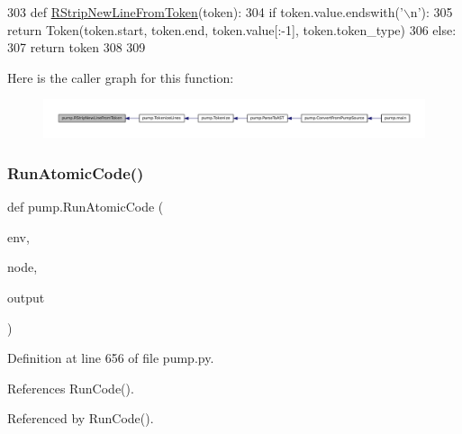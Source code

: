 \begin{DoxyCode}
303 \textcolor{keyword}{def }\hyperlink{namespacepump_ae07150d94399cbe1661abe5929f921e0}{RStripNewLineFromToken}(token):
304   \textcolor{keywordflow}{if} token.value.endswith(\textcolor{stringliteral}{'\(\backslash\)n'}):
305     \textcolor{keywordflow}{return} Token(token.start, token.end, token.value[:-1], token.token\_type)
306   \textcolor{keywordflow}{else}:
307     \textcolor{keywordflow}{return} token
308 
309 
\end{DoxyCode}
Here is the caller graph for this function\+:
\nopagebreak
\begin{figure}[H]
\begin{center}
\leavevmode
\includegraphics[width=350pt]{namespacepump_ae07150d94399cbe1661abe5929f921e0_icgraph}
\end{center}
\end{figure}
\mbox{\label{namespacepump_a901e6abd34691a0d779178a615cc09c1}} 
\subsubsection{\texorpdfstring{Run\+Atomic\+Code()}{RunAtomicCode()}}
{\footnotesize\ttfamily def pump.\+Run\+Atomic\+Code (\begin{DoxyParamCaption}\item[{}]{env,  }\item[{}]{node,  }\item[{}]{output }\end{DoxyParamCaption})}



Definition at line 656 of file pump.\+py.



References Run\+Code().



Referenced by Run\+Code().


